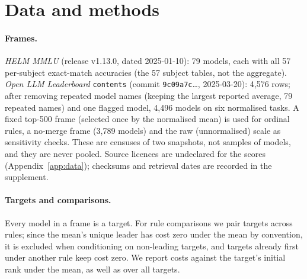 \section{Data and methods}
\label{sec:methods}
\paragraph{Frames.}
\emph{HELM MMLU} (release v1.13.0, dated 2025-01-10): 79 models, each with all 57 per-subject exact-match accuracies (the 57 subject tables, not the aggregate). \emph{Open LLM Leaderboard} \texttt{contents} (commit \texttt{9c09a7c}\ldots, 2025-03-20): 4{,}576 rows; after removing repeated model names (keeping the largest reported average, 79 repeated names) and one flagged model, 4{,}496 models on six normalised tasks. A fixed top-500 frame (selected once by the normalised mean) is used for ordinal rules, a no-merge frame (3{,}789 models) and the raw (unnormalised) scale as sensitivity checks. These are censuses of two snapshots, not samples of models, and they are never pooled. Source licences are undeclared for the scores (Appendix~\ref{app:data}); checksums and retrieval dates are recorded in the supplement.

\paragraph{Targets and comparisons.}
Every model in a frame is a target. For rule comparisons we pair targets across rules; since the mean's unique leader has cost zero under the mean by convention, it is excluded when conditioning on non-leading targets, and targets already first under another rule keep cost zero. We report costs against the target's initial rank under the mean, as well as over all targets.

